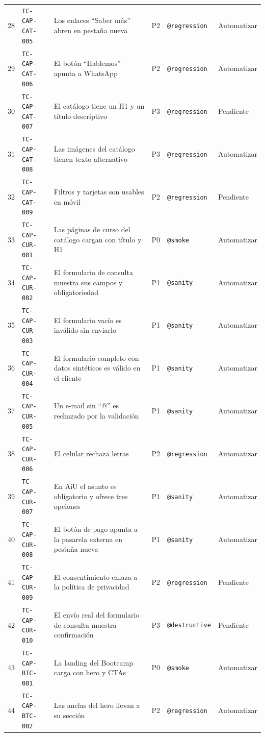 \documentclass[11pt,a4paper]{article}
\newcommand{\tcid}[1]{\texttt{#1}}
\begin{document}
{\begin{xltabular}{\textwidth}{@{}r l X c l l@{}}
28 & \tcid{TC-CAP-CAT-005} & Los enlaces ``Saber más'' abren en pestaña nueva & P2 & \texttt{@regression} & Automatizar \\
29 & \tcid{TC-CAP-CAT-006} & El botón ``Hablemos'' apunta a WhatsApp & P2 & \texttt{@regression} & Automatizar \\
30 & \tcid{TC-CAP-CAT-007} & El catálogo tiene un H1 y un título descriptivo & P3 & \texttt{@regression} & Pendiente \\
31 & \tcid{TC-CAP-CAT-008} & Las imágenes del catálogo tienen texto alternativo & P3 & \texttt{@regression} & Automatizar \\
32 & \tcid{TC-CAP-CAT-009} & Filtros y tarjetas son usables en móvil & P2 & \texttt{@regression} & Pendiente \\
33 & \tcid{TC-CAP-CUR-001} & Las páginas de curso del catálogo cargan con título y H1 & P0 & \texttt{@smoke} & Automatizar \\
34 & \tcid{TC-CAP-CUR-002} & El formulario de consulta muestra sus campos y obligatoriedad & P1 & \texttt{@sanity} & Automatizar \\
35 & \tcid{TC-CAP-CUR-003} & El formulario vacío es inválido sin enviarlo & P1 & \texttt{@sanity} & Automatizar \\
36 & \tcid{TC-CAP-CUR-004} & El formulario completo con datos sintéticos es válido en el cliente & P1 & \texttt{@sanity} & Automatizar \\
37 & \tcid{TC-CAP-CUR-005} & Un e-mail sin ``@'' es rechazado por la validación & P1 & \texttt{@sanity} & Automatizar \\
38 & \tcid{TC-CAP-CUR-006} & El celular rechaza letras & P2 & \texttt{@regression} & Automatizar \\
39 & \tcid{TC-CAP-CUR-007} & En AiU el asunto es obligatorio y ofrece tres opciones & P1 & \texttt{@sanity} & Automatizar \\
40 & \tcid{TC-CAP-CUR-008} & El botón de pago apunta a la pasarela externa en pestaña nueva & P1 & \texttt{@sanity} & Automatizar \\
41 & \tcid{TC-CAP-CUR-009} & El consentimiento enlaza a la política de privacidad & P2 & \texttt{@regression} & Pendiente \\
42 & \tcid{TC-CAP-CUR-010} & El envío real del formulario de consulta muestra confirmación & P3 & \texttt{@destructive} & Pendiente \\
43 & \tcid{TC-CAP-BTC-001} & La landing del Bootcamp carga con hero y CTAs & P0 & \texttt{@smoke} & Automatizar \\
44 & \tcid{TC-CAP-BTC-002} & Las anclas del hero llevan a su sección & P2 & \texttt{@regression} & Automatizar \\

\end{xltabular}}
\end{document}
